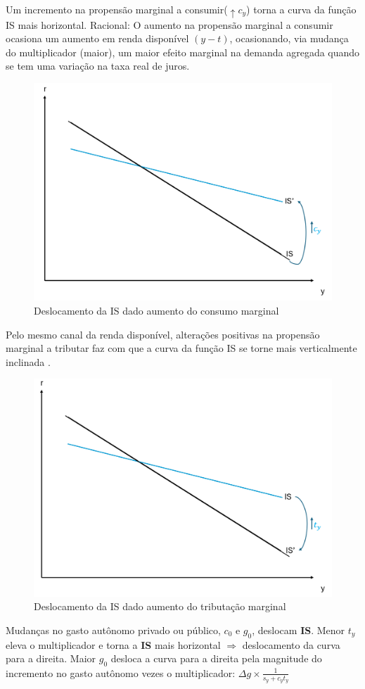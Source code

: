 \documentclass[a4paper,12pt]{article}[abntex2]
\begin{document}
Um incremento na propensão marginal a consumir(\(\uparrow c_y\)) torna a curva da função IS mais horizontal. Racional: O aumento na propensão marginal a consumir ocasiona um aumento em renda disponível  \((y − t)\),  ocasionando,  via  mudança  do  multiplicador  (maior),  um  maior  efeito marginal na demanda agregada quando se tem uma variação na taxa real de juros.
\begin{figure}[H]
    \centering
    \caption{Deslocamento da IS dado aumento do consumo marginal}
    \includegraphics[width=0.7\linewidth]{Imagens/a2i4.png}
\end{figure}

Pelo mesmo canal da renda disponível, alterações positivas na propensão marginal a tributar faz com que a curva da função IS se torne mais verticalmente inclinada . 

\begin{figure}[H]
    \centering
    \caption{Deslocamento da IS dado aumento do tributação marginal}
    \includegraphics[width=0.75\linewidth]{Imagens/a2i5.png}
\end{figure}

Mudanças no gasto autônomo privado ou público, $c_0$ e $g_0$, deslocam \textbf{IS}. Menor $t_y$ eleva o multiplicador e torna a \textbf{IS} mais horizontal $\Rightarrow$ deslocamento da curva para a direita. Maior $g_0$ desloca a curva para a direita pela magnitude do incremento no gasto autônomo vezes o multiplicador: $\Delta g \times \frac{1}{s_y+c_yt_y}$
\end{document}
